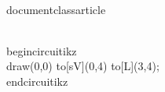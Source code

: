 \\documentclass{article}
\begin{document}
\\begin{circuitikz}
\\draw(0,0) to[sV](0,4) to[L](3,4);
\\end{circuitikz}
\
\end{document}
